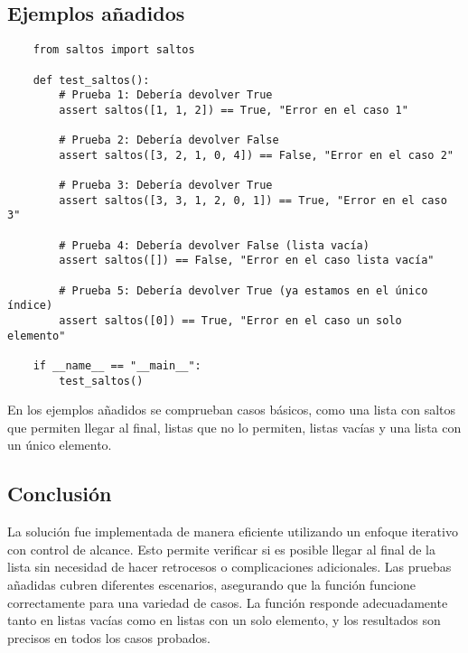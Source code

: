 \documentclass{article}
\begin{document}
\subsection*{Ejemplos añadidos}
\begin{lstlisting}
    from saltos import saltos

    def test_saltos():
        # Prueba 1: Debería devolver True
        assert saltos([1, 1, 2]) == True, "Error en el caso 1"

        # Prueba 2: Debería devolver False
        assert saltos([3, 2, 1, 0, 4]) == False, "Error en el caso 2"

        # Prueba 3: Debería devolver True
        assert saltos([3, 3, 1, 2, 0, 1]) == True, "Error en el caso 3"

        # Prueba 4: Debería devolver False (lista vacía)
        assert saltos([]) == False, "Error en el caso lista vacía"

        # Prueba 5: Debería devolver True (ya estamos en el único índice)
        assert saltos([0]) == True, "Error en el caso un solo elemento"

    if __name__ == "__main__":
        test_saltos()
\end{lstlisting}
En los ejemplos añadidos se comprueban casos básicos, como una lista con saltos que permiten llegar al final, listas que no lo permiten, listas vacías y una lista con un único elemento.

\subsection*{Conclusión}
La solución fue implementada de manera eficiente utilizando un enfoque iterativo con control de alcance. Esto permite verificar si es posible llegar al final de la lista sin necesidad de hacer retrocesos o complicaciones adicionales. Las pruebas añadidas cubren diferentes escenarios, asegurando que la función funcione correctamente para una variedad de casos. La función responde adecuadamente tanto en listas vacías como en listas con un solo elemento, y los resultados son precisos en todos los casos probados.
\end{document}
